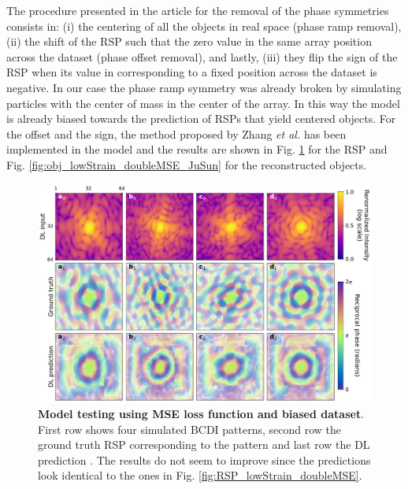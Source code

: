The procedure presented in the article for the removal of the phase symmetries consists in: (i) the centering of all the 
objects in real space (phase ramp removal), (ii) the shift of the RSP such that the zero value in the same array position 
across the dataset (phase offset removal), and lastly, (iii) they flip the sign of the RSP when its value in corresponding 
to a fixed position across the dataset is negative. In our case the phase ramp symmetry was already broken by simulating 
particles with the center of mass in the center of the array. In this way the model is already biased towards the prediction 
of RSPs that yield centered objects. For the offset and the sign, the method proposed by Zhang \textit{et al.} has been 
implemented in the model and the results are shown in Fig. \ref{fig:RSP_lowStrain_doubleMSE_JuSun} for the RSP and 
Fig. \ref{fig:obj_lowStrain_doubleMSE_JuSun} for the reconstructed objects. 

\begin{figure}[H]
    \centering
    \includegraphics[width=.8\textwidth]{figures/Phasing/RSP_low_strain_doubleMSE_symmJuSun.pdf}
    \caption{\textbf{Model testing using MSE loss function and biased dataset}. First row shows four simulated BCDI patterns, second row the ground truth RSP 
    corresponding to the pattern and last row the DL prediction . The results do not seem to improve since the predictions 
    look identical to the ones in Fig. \ref{fig:RSP_lowStrain_doubleMSE}.}
    \label{fig:RSP_lowStrain_doubleMSE_JuSun}
\end{figure}

